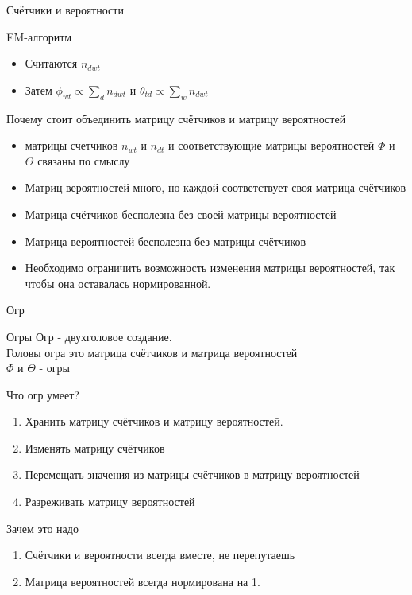 \documentclass{beamer}
\begin{document}
\begin{frame}{Счётчики и вероятности}
    \begin{block}{EM-алгоритм}
	\begin{itemize}
	    \item Считаются $n_{dwt}$
	    \item Затем $\phi_{wt} \propto \sum_d n_{dwt}  $ и $\theta_{td} \propto \sum_w n_{dwt}$
	\end{itemize}
    \end{block}
    \begin{block}{Почему стоит объединить матрицу счётчиков и матрицу вероятностей}
	\begin{itemize}
	    \item матрицы счетчиков $n_{w t}$ и $n_{d t}$ и соответствующие матрицы вероятностей $\Phi$ и $\Theta$ связаны по смыслу
	    \item Матриц вероятностей много, но каждой соответствует своя матрица счётчиков
	    \item Матрица счётчиков бесполезна без своей матрицы вероятностей
	    \item Матрица вероятностей бесполезна без  матрицы счётчиков 
	    \item Необходимо ограничить возможность изменения матрицы вероятностей, так чтобы она оставалась нормированной.
	\end{itemize}	
    \end{block}
\end{frame}

\begin{frame}{Огр}    
    \begin{block}{Огры}
	Огр \-- двухголовое создание.\\
	Головы огра это матрица счётчиков и матрица вероятностей\\
	$\Phi$ и $\Theta$ \-- огры
    \end{block}
    \begin{block}{Что огр умеет?}
	\begin{enumerate}
	    \item Хранить матрицу счётчиков и матрицу вероятностей.
	    \item Изменять матрицу счётчиков
	    \item Перемещать значения из матрицы счётчиков в матрицу вероятностей
	    \item Разреживать матрицу вероятностей
	\end{enumerate}	
    \end{block}

    \begin{block}{Зачем это надо}
	\begin{enumerate}
	    \item Счётчики и вероятности всегда вместе, не перепутаешь
	    \item Матрица вероятностей всегда нормирована на 1.	    
	\end{enumerate}	
    \end{block}  
\end{frame}
\end{document}
